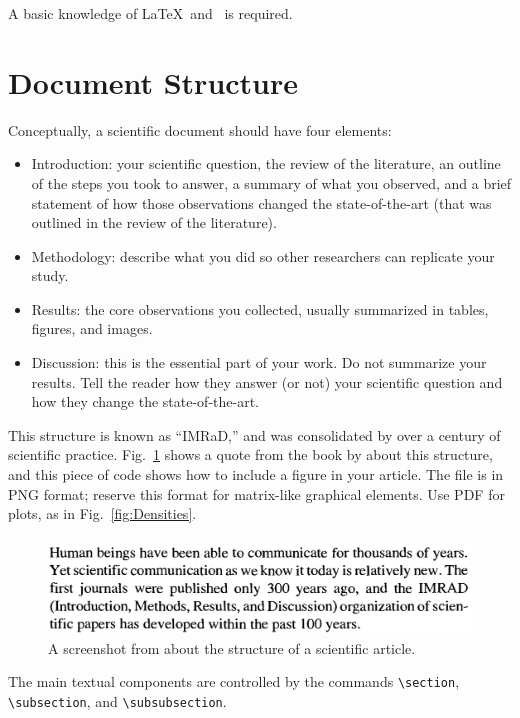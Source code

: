 \documentclass[conference,a4paper]{IEEEtran}
\begin{document}
A basic knowledge of \LaTeX\ and \BibTeX\ is required.

\section{Document Structure}

Conceptually, a scientific document should have four elements:
\begin{itemize}
	\item Introduction: your scientific question, the review of the literature, an outline of the steps you took to answer, a summary of what you observed, and a brief statement of how those observations changed the state-of-the-art (that was outlined in the review of the literature).
	\item Methodology: describe what you did so other researchers can replicate your study.
	\item Results: the core observations you collected, usually summarized in tables, figures, and images.
	\item Discussion: this is the essential part of your work. Do not summarize your results. Tell the reader how they answer (or not) your scientific question and how they change the state-of-the-art.
\end{itemize}
This structure is known as ``IMRaD,'' and was consolidated by over a century of scientific practice.
Fig.~\ref{fig:IMRAD} shows a quote from the book by \citet{Day1998} about this structure, and this piece of code shows how to include a figure in your article.
The file is in PNG format; reserve this format for matrix-like graphical elements.
Use PDF for plots, as in Fig.~\ref{fig:Densities}.

\begin{figure}[hbt]
	\centering
	\includegraphics[width=.9\linewidth]{Day-IMRaD}
	\caption{A screenshot from \citet{Day1998} about the structure of a scientific article.}\label{fig:IMRAD}
\end{figure}

The main textual components are controlled by the commands \verb|\section|, \verb|\subsection|, and \verb|\subsubsection|.
\end{document}
